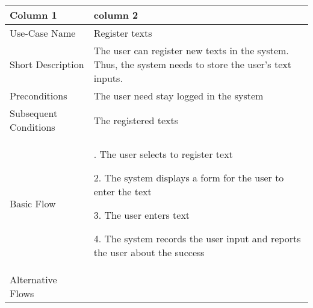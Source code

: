 \documentclass[11pt, twoside, a4paper]{book}
\begin{document}
			\begin{tabular}{|>{\centering\arraybackslash}m{6cm} |>{\centering\arraybackslash}m{6cm}|}
				\hline
				\centering \textbf{Column 1} & \textbf{column 2} 																						\\ \hline
				Use-Case Name 			& Register texts																								\\ \hline
				Short Description  		& The user can register new texts in the system. Thus, the system needs to store the user's text inputs.    	\\ \hline	
				Preconditions  			& The user need stay logged in the system      																\\ \hline
				Subsequent Conditions	& The registered texts     																						\\ \hline
				Basic Flow  			& 1. The user selects to register text

										  2. The system displays a form for the user to enter the text
				
										  3. The user enters text
				
										  4. The system records the user input and reports the user about the success									\\ \hline
				Alternative Flows  		&       																										\\ \hline
			\end{tabular}
\end{document}

